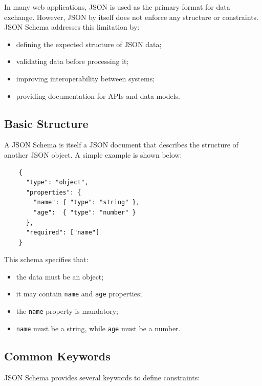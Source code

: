 \documentclass{scrbook}
\begin{document}
	In many web applications, JSON is used as the primary format for data exchange. However, JSON by itself does not enforce any structure or constraints. JSON Schema addresses this limitation by:
	
	\begin{itemize}
		\item defining the expected structure of JSON data;
		\item validating data before processing it;
		\item improving interoperability between systems;
		\item providing documentation for APIs and data models.
	\end{itemize}
	
	\subsection{Basic Structure}
	
	A JSON Schema is itself a JSON document that describes the structure of another JSON object. A simple example is shown below:
	
	\begin{lstlisting}
	{
	  "type": "object",
	  "properties": {
		"name": { "type": "string" },
		"age":  { "type": "number" }
	  },
	  "required": ["name"]
	}
	\end{lstlisting}
	
	This schema specifies that:
	\begin{itemize}
		\item the data must be an object;
		\item it may contain \texttt{name} and \texttt{age} properties;
		\item the \texttt{name} property is mandatory;
		\item \texttt{name} must be a string, while \texttt{age} must be a number.
	\end{itemize}
	
	\subsection{Common Keywords}
	
	JSON Schema provides several keywords to define constraints:
	
\end{document}
